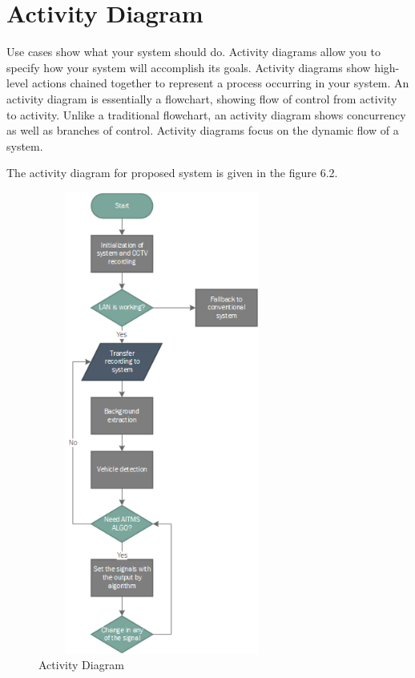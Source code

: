 \documentclass[openany,12pt]{report}
\begin{document}
	\section{Activity Diagram}
	\hspace*{0.5in}Use cases show what your system should do. Activity diagrams allow you to specify how your system will accomplish its goals. Activity diagrams show high-level actions chained together to represent a process occurring in your system. An activity diagram is essentially a flowchart, showing flow of control from activity to activity. Unlike a traditional flowchart, an activity diagram shows concurrency as well as branches of control. Activity diagrams focus on the dynamic flow of a system.\\

	The activity diagram for proposed system is given in the figure 6.2.
	\begin{figure}[H]
		\centering
		\includegraphics[width=3.2in,height=6in]{./Diagrams/PNG/flow}
		\caption{Activity Diagram}
	\end{figure}
	\newpage
	
\end{document}
